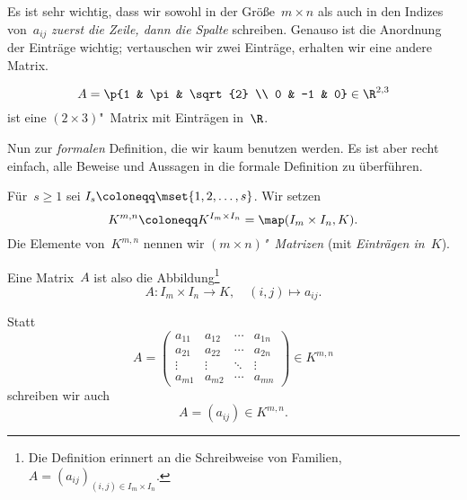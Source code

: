 \documentclass[a4paper]{article}
\begin{document}
\begin{remark}
    Es ist sehr wichtig, dass wir sowohl in der Größe~$m\times n$ als auch in den Indizes von~$a_{ij}$ \emph{zuerst die Zeile, dann die Spalte} schreiben. Genauso ist die Anordnung der Einträge wichtig; vertauschen wir zwei Einträge, erhalten wir eine andere Matrix.
\end{remark}

\begin{example}
    \begin{equation*}
        A = \p{1 & \pi & \sqrt{2} \\ 0 & -1 & 0} \in \R^{2, 3}
    \end{equation*}
    ist eine $(2\times 3)$"~Matrix mit Einträgen in~$\R$.
\end{example}

Nun zur \emph{formalen} Definition, die wir kaum benutzen werden. Es ist aber recht einfach, alle Beweise und Aussagen in die formale Definition zu überführen.

\begin{definition}
    Für~$s \geq 1$ sei $I_s \coloneqq \mset{1, 2,\dots,s}$. Wir setzen
    \begin{equation*}
        K^{m,n} \coloneqq K^{I_m\times I_n} = \map(I_m\times I_n,K).
    \end{equation*}
    Die Elemente von~$K^{m,n}$ nennen wir \emph{$(m\times n)$"~Matrizen} (mit \emph{Einträgen in~$K$}).

    Eine Matrix~$A$ ist also die Abbildung\footnote{Die Definition erinnert an die Schreibweise von Familien, $A = (a_{ij})_{(i,j)\in I_m\times I_n}$.}
    \begin{equation*}
        A\colon I_m\times I_n \to K,\quad (i,j) \mapsto a_{ij}.
    \end{equation*}
\end{definition}

\begin{notation}
    Statt
    \begin{equation*}
        A = \begin{pmatrix}
            a_{11} & a_{12} & \cdots & a_{1n} \\
            a_{21} & a_{22} & \cdots & a_{2n} \\
            \vdots & \vdots & \ddots & \vdots \\
            a_{m1} & a_{m2} & \cdots & a_{mn}
        \end{pmatrix}
        \in K^{m,n}
    \end{equation*}
    schreiben wir auch
    \begin{equation*}
        A = (a_{ij}) \in K^{m,n}.
    \end{equation*}
\end{notation}
\end{document}
